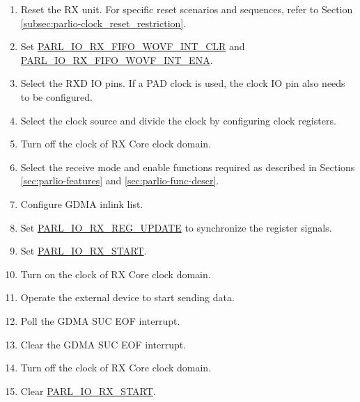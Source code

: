 \documentclass[main\_\_EN.tex]{subfiles}
\begin{document}
\begin{enumerate}
    \item Reset the RX unit. For specific reset scenarios and sequences, refer to Section \ref{subsec:parlio-clock_reset_restriction}.
    \item Set \hyperref[fielddesc:PARLIORXFIFOWOVFINTCLR]{PARL\_IO\_RX\_FIFO\_WOVF\_INT\_CLR} and \hyperref[fielddesc:PARLIORXFIFOWOVFINTENA]{PARL\_IO\_RX\_FIFO\_WOVF\_INT\_ENA}.
    \item Select the RXD IO pins. If a PAD clock is used, the clock IO pin also needs to be configured.
    \item Select the clock source and divide the clock by configuring clock registers.
    \item Turn off the clock of RX Core clock domain.
    \item Select the receive mode and enable functions required as described in Sections \ref{sec:parlio-features} and \ref{sec:parlio-func-descr}.
    \item Configure GDMA inlink list.
    \item Set \hyperref[fielddesc:PARLIORXREGUPDATE]{PARL\_IO\_RX\_REG\_UPDATE} to synchronize the register signals.
    \item Set \hyperref[fielddesc:PARLIORXSTART]{PARL\_IO\_RX\_START}.
    \item Turn on the clock of RX Core clock domain.
    \item Operate the external device to start sending data.
    \item Poll the GDMA SUC EOF interrupt.
    \item Clear the GDMA SUC EOF interrupt.
    \item Turn off the clock of RX Core clock domain.
    \item Clear \hyperref[fielddesc:PARLIORXSTART]{PARL\_IO\_RX\_START}.
\end{enumerate}
\end{document}
